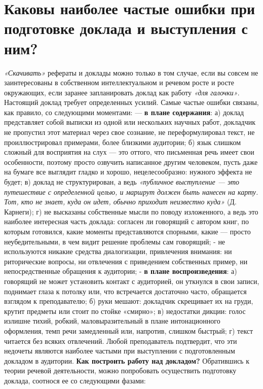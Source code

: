 \chapter{\textbf{Каковы наиболее частые ошибки при подготовке доклада и выступления с ним?}}
\textit{ «Скачивать»} рефераты и доклады можно только в том случае, если вы совсем не заинтересованы в собственном интеллектуальном и речевом росте и росте окружающих, если заранее запланировать доклад как работу \textit{«для галочки»}.
Настоящий доклад требует определенных усилий. Самые частые ошибки связаны, как правило, со следующими моментами:
— \textbf{в плане содержания}: а) доклад представляет собой выписки из одной или нескольких научных работ, докладчик не пропустил этот материал через свое сознание, не переформулировал текст, не проиллюстрировал примерами, более близкими аудитории; б) язык слишком сложный для восприятия на слух — это оттого, что письменная речь имеет свои особенности, поэтому просто озвучить написанное другим человеком, пусть даже на бумаге все выглядит гладко и хорошо, нецелесообразно: нужного эффекта не будет; в) доклад не структурирован, а ведь \textit{«публичное выступление — это путешествие с определенной целью, и маршрут должен быть нанесен на карту. Тот, кто не знает, куда он идет, обычно приходит неизвестно куда»} (Д. Карнеги); г) не высказаны собственные мысли по поводу изложенного, а ведь это наиболее интересная часть доклада: согласен ли говорящий с автором книг, по которым готовился, какие моменты представляются спорными, какие — просто неубедительными, в чем видит решение проблемы сам говорящий; - не используются никакие средства диалогизации, привлечения внимания: ни риторические вопросы, ни отвлечения с приведением собственных пример, ни непосредственные обращения к аудитории;
-  \textbf{в плане воспроизведения}: а) говорящий не может установить контакт с аудиторией, он уткнулся в свои записи, поднимает глаза к потолку или, что встречается достаточно часто, обращается взглядом к преподавателю; б) руки мешают: докладчик скрещивает их на груди, крутит предметы или стоит по стойке «смирно»; в) недостатки дикции: голос излишне тихий, робкий, маловыразительный в плане интонационного оформления, темп речи замедленный или, напротив, слишком быстрый; г) текст читается без всяких отвлечений. Любой преподаватель подтвердит, что эти недочеты являются наиболее частыми при выступлении с подготовленным докладом в аудитории.
 \textbf{Как построить работу над докладом?}
Обратившись к теории речевой деятельности, можно попробовать осуществить подготовку доклада, соотнося ее со следующими фазами:

